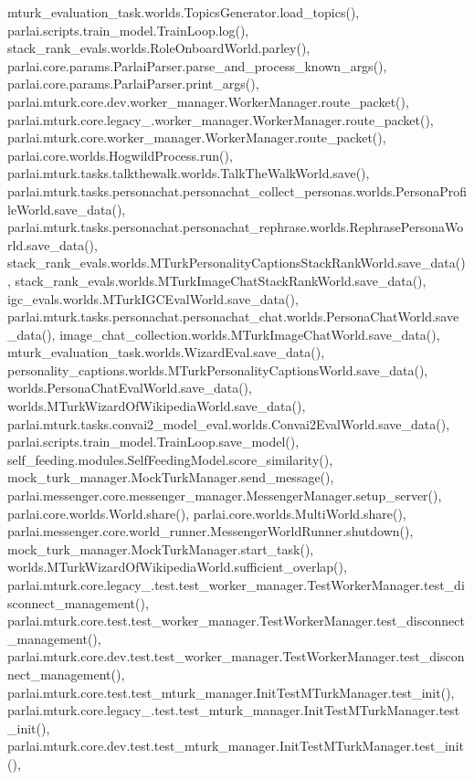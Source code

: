 mturk\+\_\+evaluation\+\_\+task.\+worlds.\+Topics\+Generator.\+load\+\_\+topics(), parlai.\+scripts.\+train\+\_\+model.\+Train\+Loop.\+log(), stack\+\_\+rank\+\_\+evals.\+worlds.\+Role\+Onboard\+World.\+parley(), parlai.\+core.\+params.\+Parlai\+Parser.\+parse\+\_\+and\+\_\+process\+\_\+known\+\_\+args(), parlai.\+core.\+params.\+Parlai\+Parser.\+print\+\_\+args(), parlai.\+mturk.\+core.\+dev.\+worker\+\_\+manager.\+Worker\+Manager.\+route\+\_\+packet(), parlai.\+mturk.\+core.\+legacy\+\_.\+worker\+\_\+manager.\+Worker\+Manager.\+route\+\_\+packet(), parlai.\+mturk.\+core.\+worker\+\_\+manager.\+Worker\+Manager.\+route\+\_\+packet(), parlai.\+core.\+worlds.\+Hogwild\+Process.\+run(), parlai.\+mturk.\+tasks.\+talkthewalk.\+worlds.\+Talk\+The\+Walk\+World.\+save(), parlai.\+mturk.\+tasks.\+personachat.\+personachat\+\_\+collect\+\_\+personas.\+worlds.\+Persona\+Profile\+World.\+save\+\_\+data(), parlai.\+mturk.\+tasks.\+personachat.\+personachat\+\_\+rephrase.\+worlds.\+Rephrase\+Persona\+World.\+save\+\_\+data(), stack\+\_\+rank\+\_\+evals.\+worlds.\+M\+Turk\+Personality\+Captions\+Stack\+Rank\+World.\+save\+\_\+data(), stack\+\_\+rank\+\_\+evals.\+worlds.\+M\+Turk\+Image\+Chat\+Stack\+Rank\+World.\+save\+\_\+data(), igc\+\_\+evals.\+worlds.\+M\+Turk\+I\+G\+C\+Eval\+World.\+save\+\_\+data(), parlai.\+mturk.\+tasks.\+personachat.\+personachat\+\_\+chat.\+worlds.\+Persona\+Chat\+World.\+save\+\_\+data(), image\+\_\+chat\+\_\+collection.\+worlds.\+M\+Turk\+Image\+Chat\+World.\+save\+\_\+data(), mturk\+\_\+evaluation\+\_\+task.\+worlds.\+Wizard\+Eval.\+save\+\_\+data(), personality\+\_\+captions.\+worlds.\+M\+Turk\+Personality\+Captions\+World.\+save\+\_\+data(), worlds.\+Persona\+Chat\+Eval\+World.\+save\+\_\+data(), worlds.\+M\+Turk\+Wizard\+Of\+Wikipedia\+World.\+save\+\_\+data(), parlai.\+mturk.\+tasks.\+convai2\+\_\+model\+\_\+eval.\+worlds.\+Convai2\+Eval\+World.\+save\+\_\+data(), parlai.\+scripts.\+train\+\_\+model.\+Train\+Loop.\+save\+\_\+model(), self\+\_\+feeding.\+modules.\+Self\+Feeding\+Model.\+score\+\_\+similarity(), mock\+\_\+turk\+\_\+manager.\+Mock\+Turk\+Manager.\+send\+\_\+message(), parlai.\+messenger.\+core.\+messenger\+\_\+manager.\+Messenger\+Manager.\+setup\+\_\+server(), parlai.\+core.\+worlds.\+World.\+share(), parlai.\+core.\+worlds.\+Multi\+World.\+share(), parlai.\+messenger.\+core.\+world\+\_\+runner.\+Messenger\+World\+Runner.\+shutdown(), mock\+\_\+turk\+\_\+manager.\+Mock\+Turk\+Manager.\+start\+\_\+task(), worlds.\+M\+Turk\+Wizard\+Of\+Wikipedia\+World.\+sufficient\+\_\+overlap(), parlai.\+mturk.\+core.\+legacy\+\_.\+test.\+test\+\_\+worker\+\_\+manager.\+Test\+Worker\+Manager.\+test\+\_\+disconnect\+\_\+management(), parlai.\+mturk.\+core.\+test.\+test\+\_\+worker\+\_\+manager.\+Test\+Worker\+Manager.\+test\+\_\+disconnect\+\_\+management(), parlai.\+mturk.\+core.\+dev.\+test.\+test\+\_\+worker\+\_\+manager.\+Test\+Worker\+Manager.\+test\+\_\+disconnect\+\_\+management(), parlai.\+mturk.\+core.\+test.\+test\+\_\+mturk\+\_\+manager.\+Init\+Test\+M\+Turk\+Manager.\+test\+\_\+init(), parlai.\+mturk.\+core.\+legacy\+\_.\+test.\+test\+\_\+mturk\+\_\+manager.\+Init\+Test\+M\+Turk\+Manager.\+test\+\_\+init(), parlai.\+mturk.\+core.\+dev.\+test.\+test\+\_\+mturk\+\_\+manager.\+Init\+Test\+M\+Turk\+Manager.\+test\+\_\+init(), 